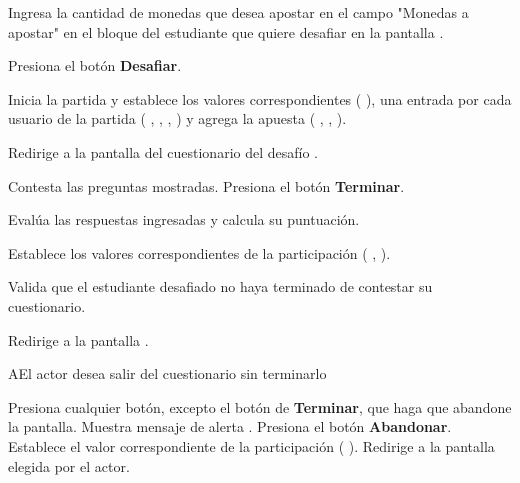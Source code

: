 \begin{UCtrayectoria}%
%

    \Actor Ingresa la cantidad de monedas que desea apostar en el campo "Monedas a apostar" en el bloque del estudiante que quiere desafiar en la pantalla .

    \Actor Presiona el botón {\bf Desafiar}.

    \Sistema Inicia la partida y establece los valores correspondientes (  ), una entrada por cada usuario de la partida  ( , , ,  ) y agrega la apuesta ( , ,  ).

    \Sistema Redirige a la pantalla del cuestionario del desafío .

    \Actor Contesta las preguntas mostradas. 
    \label{CU-C10-contesta-cuestionario}
    \Actor Presiona el botón {\bf Terminar}.

    \Sistema Evalúa las respuestas ingresadas y calcula su puntuación.

    \Sistema Establece los valores correspondientes de la participación  (
    ,
    ).

    \Sistema Valida que el estudiante desafiado no haya terminado de contestar su cuestionario. 

    \Sistema Redirige a la pantalla .

\end{UCtrayectoria}

\begin{UCtrayectoriaA}%
  {A}{El actor desea salir del cuestionario sin terminarlo}

  \Actor Presiona cualquier botón, excepto el botón de {\bf Terminar}, que haga que abandone la pantalla.
  \Sistema Muestra mensaje de alerta .
  \Actor Presiona el botón {\bf Abandonar}. 
  \Sistema Establece el valor correspondiente de la participación  (
  ).
  \Sistema Redirige a la pantalla elegida por el actor.

\end{UCtrayectoriaA}

